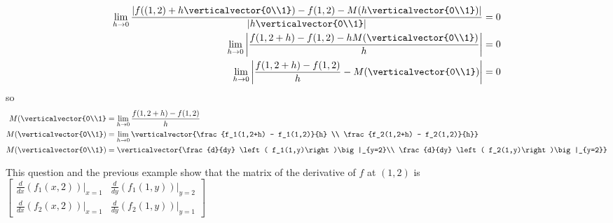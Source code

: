 \documentclass{ximera}
\begin{document}
\begin{free-response}

 \begin{align*}
 	  \displaystyle\lim_{h \to 0} \frac{\left|f((1,2)+h\verticalvector{0\\1}) - f(1,2) - M(h\verticalvector{0\\1})\right|}{\left|h \verticalvector{0\\1}\right|} &= 0\\
	  \displaystyle\lim_{h \to 0}\left| \frac{f(1,2+h) - f(1,2) - hM(\verticalvector{0\\1})}{h} \right| &= 0\\
	  \displaystyle\lim_{h \to 0}\left| \frac{f(1,2+h) - f(1,2)}{h} -M(\verticalvector{0\\1})\right| &= 0
	  \end{align*}
	  so
	  \begin{align*}
	  M(\verticalvector{0\\1} &= \displaystyle\lim_{ h \to 0 } \frac{f(1,2+h) - f(1,2)}{h}\\
	  M(\verticalvector{0\\1}) &= \displaystyle\lim_{ h \to 0 } \verticalvector{\frac{f_1(1,2+h) - f_1(1,2)}{h} \\ \frac{f_2(1,2+h) - f_2(1,2)}{h}}\\
	  M(\verticalvector{0\\1}) &= \verticalvector{\frac{d}{dy} \left( f_1(1,y)\right)\big|_{y=2}\\ \frac{d}{dy} \left( f_2(1,y)\right)\big|_{y=2}}
	 \end{align*}
\end{free-response}

This question and the previous example show that the matrix of the derivative of $f$ at $(1,2)$ is 
\(
\begin{bmatrix} \frac{d}{dx}(f_1(x,2))\big|_{x=1} & \frac{d}{dy}(f_1(1,y))\big|_{y=2}
\\ 
\frac{d}{dx}(f_2(x,2))\big|_{x=1} & \frac{d}{dy}(f_2(1,y))\big|_{y=1}\end{bmatrix}
\)
\end{document}

